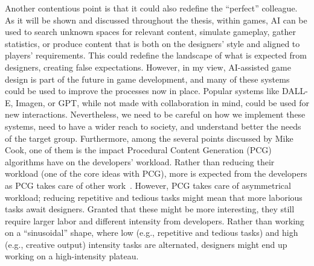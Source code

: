 Another contentious point is that it could also redefine the ``perfect'' colleague. As it will be shown and discussed throughout the thesis, within games, AI can be used to search unknown spaces for relevant content, simulate gameplay, gather statistics, or produce content that is both on the designers' style and aligned to players' requirements. This could redefine the landscape of what is expected from designers, creating false expectations. However, in my view, AI-assisted game design is part of the future in game development, and many of these systems could be used to improve the processes now in place. Popular systems like DALL-E, Imagen, or GPT, while not made with collaboration in mind, could be used for new interactions. Nevertheless, we need to be careful on how we implement these systems, need to have a wider reach to society, and understand better the needs of the target group. Furthermore, among the several points discussed by Mike Cook, one of them is the impact Procedural Content Generation (PCG) algorithms have on the developers' workload. Rather than reducing their workload (one of the core ideas with PCG), more is expected from the developers as PCG takes care of other work~\cite{cook_social_2021}. However, PCG takes care of asymmetrical workload; reducing repetitive and tedious tasks might mean that more laborious tasks await designers. Granted that these might be more interesting, they still require larger labor and different intensity from developers. Rather than working on a ``sinusoidal'' shape, where low (e.g., repetitive and tedious tasks) and high (e.g., creative output) intensity tasks are alternated, designers might end up working on a high-intensity plateau.












